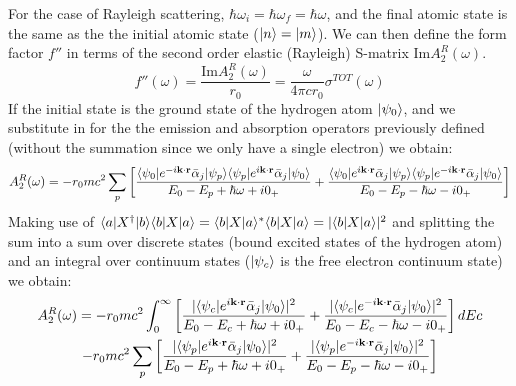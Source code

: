 For the case of Rayleigh scattering, 
$\hbar \omega_i = \hbar \omega_f = \hbar \omega$, and the final atomic state is the
same as the the initial atomic state ($|n \rangle = |m \rangle$). 
We can then define the form factor $f''$ in terms of the second order elastic
(Rayleigh) S-matrix $\mathrm{Im}A_2^R(\omega)$.
\begin{equation}
    f''(\omega) = \frac{\mathrm{Im}A_2^R(\omega)}{r_0} 
                = \frac{\omega}{4\pi c r_0} \sigma^{TOT}(\omega)
\end{equation}
If the initial state is the ground state of the hydrogen atom $|\psi_0 \rangle$,
and we substitute in for the the emission and absorption operators previously
defined (without the summation since we only have a single electron) we 
obtain:
\begin{equation}
        A_2^R(\omega) = 
        -r_0 mc^2 \sum_p \left[
        \frac{
            \langle \psi_0| e^{-i \mathbf{k} \cdot \mathbf{r} } \bar{\alpha}_j |\psi_p \rangle 
            \langle \psi_p| e^{i \mathbf{k} \cdot \mathbf{r} }  \bar{\alpha}_j |\psi_0 \rangle
        }{
            E_0 - E_p + \hbar\omega + i0_+
        } 
     +
        \frac{
           \langle \psi_0| e^{i \mathbf{k} \cdot \mathbf{r} }   \bar{\alpha}_j |\psi_p \rangle 
           \langle \psi_p| e^{-i \mathbf{k} \cdot \mathbf{r} }  \bar{\alpha}_j |\psi_0 \rangle 
        }{
           E_0 - E_p - \hbar\omega - i0_+
        }
        \right]
\end{equation}
Making use of 
\(
    \langle a| X^\dag |b \rangle \langle b| X |a \rangle 
  = \langle b| X |a \rangle^* \langle b| X |a \rangle = | \langle b| X |a \rangle |^2
\)
and splitting the sum into a sum over discrete states (bound excited states of
the hydrogen atom) and an integral over 
continuum states ($|\psi_c \rangle$ is the free electron continuum state) we obtain:
\begin{multline}
    A_2^R(\omega)   =  
         -r_0 mc^2  \int_0^\infty
        \left[
             \frac{
            | \langle \psi_c| e^{i \mathbf{k} \cdot \mathbf{r} }  \bar{\alpha}_j |\psi_0 \rangle |^2
        }{
            E_0 - E_c + \hbar\omega + i0_+
        } 
        +
        \frac{
           | \langle \psi_c| e^{-i \mathbf{k} \cdot \mathbf{r} }  \bar{\alpha}_j |\psi_0 \rangle |^2
        }{
           E_0 - E_c - \hbar\omega - i0_+
        }
        \right]
        dEc
        \\
         -r_0 mc^2  \sum_p 
        \left[
        \frac{
            | \langle \psi_p| e^{i \mathbf{k} \cdot \mathbf{r} }  \bar{\alpha}_j |\psi_0 \rangle |^2
        }{
            E_0 - E_p + \hbar\omega + i0_+
        } 
     +
        \frac{
           | \langle \psi_p| e^{-i \mathbf{k} \cdot \mathbf{r} }  \bar{\alpha}_j |\psi_0 \rangle |^2
        }{
           E_0 - E_p - \hbar\omega - i0_+
        }
        \right]
\end{multline}
